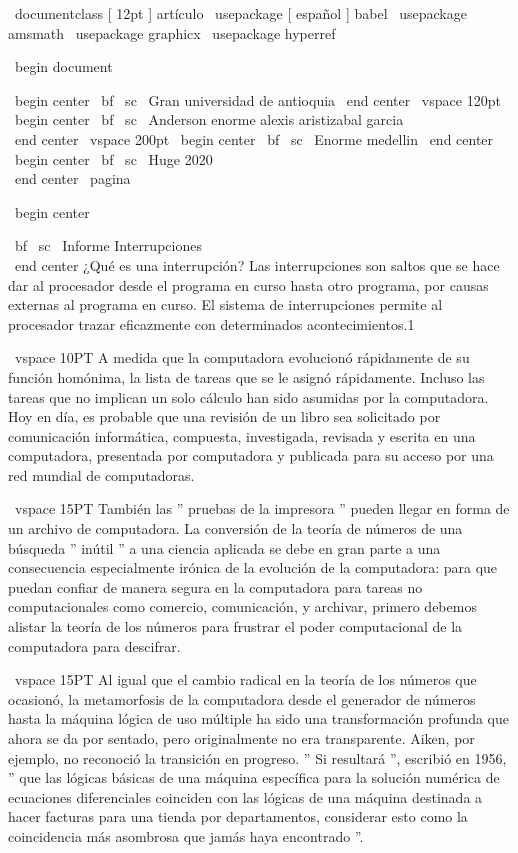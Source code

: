 \ documentclass [ 12pt ] { artículo }
\ usepackage [ español ] { babel }
\ usepackage { amsmath }
\ usepackage { graphicx }
\ usepackage { hyperref }

\ begin { document }

\ begin { center }
\ bf { \ sc \ Gran universidad de antioquia}
\ end { center }
\ vspace {120pt}
\ begin { center }
\ bf { \ sc \ Anderson enorme alexis aristizabal garcia} \\
\ end { center }
\ vspace {200pt}
\ begin { center }
\ bf { \ sc \ Enorme medellin}
\ end { center }
\ begin { center }
\ bf { \ sc \ Huge 2020} \\
\ end { center } \
\nueva pagina



\ begin { center }

\ bf { \ sc \ Informe Interrupciones} \\
\ end { center }
\grande
¿Qué es una interrupción?
Las interrupciones son saltos que se hace dar al procesador desde el programa en curso hasta otro programa, por causas externas al programa en curso. El sistema de interrupciones permite al procesador trazar eficazmente con determinados acontecimientos.1


\ vspace {10PT}
A medida que la computadora evolucionó rápidamente de su función homónima, la lista de tareas que se le asignó rápidamente. Incluso las tareas que no implican un solo cálculo han sido asumidas por la computadora. Hoy en día, es probable que una revisión de un libro sea solicitado por comunicación informática, compuesta, investigada, revisada y escrita en una computadora, presentada por computadora y publicada para su acceso por una red mundial de computadoras.


\ vspace {15PT}
También las '' pruebas de la impresora '' pueden llegar en forma de un archivo de computadora. La conversión de la teoría de números de una búsqueda '' inútil '' a una ciencia aplicada se debe en gran parte a una consecuencia especialmente irónica de la evolución de la computadora: para que puedan confiar de manera segura en la computadora para tareas no computacionales como comercio, comunicación, y archivar, primero debemos alistar la teoría de los números para frustrar el poder computacional de la computadora para descifrar.

\ vspace {15PT}
Al igual que el cambio radical en la teoría de los números que ocasionó, la metamorfosis de la computadora desde el generador de números hasta la máquina lógica de uso múltiple ha sido una transformación profunda que ahora se da por sentado, pero originalmente no era transparente. Aiken, por ejemplo, no reconoció la transición en progreso. '' Si resultará '', escribió en 1956, '' que las lógicas básicas de una máquina específica para la solución numérica de ecuaciones diferenciales coinciden con las lógicas de una máquina destinada a hacer facturas para una tienda por departamentos, considerar esto como la coincidencia más asombrosa que jamás haya encontrado ''.


